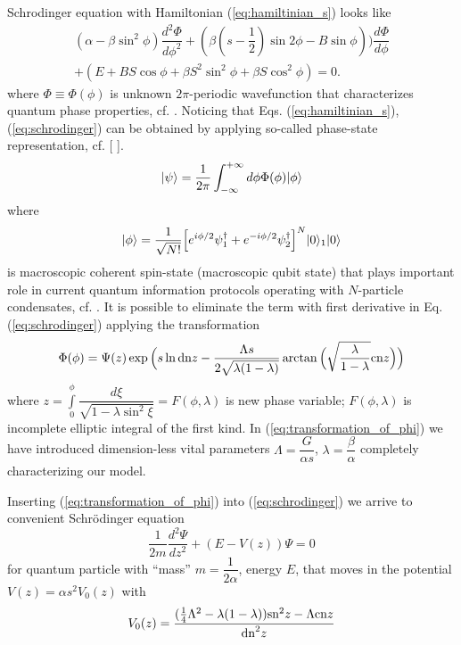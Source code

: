 \documentclass[aps, pre, preprint, groupedaddress, superscriptaddress, showkeys, showpacs] {revtex4-1}
\DeclarePairedDelimiter\ket{\lvert}{\rangle}
\begin{document}
Schrodinger equation with Hamiltonian (\ref{eq:hamiltinian_s}) looks like  
%
\begin{equation}
\begin{array}{l}
(\alpha - \beta \sin^2 \phi) \dfrac{d^2 \Phi}{d \phi^2} + (\beta(s - \dfrac{1}{2})\sin{2\phi}-B\sin{\phi})) \dfrac{d \Phi}{d \phi} \\
+ (E + BS \cos \phi + \beta S^2 \sin^2 \phi + \beta S \cos^2 \phi) = 0.
\end{array}
\label{eq:schrodinger}
\end{equation}
%
where $\Phi \equiv \Phi(\phi)$ is unknown $2\pi$-periodic wavefunction that characterizes quantum phase properties, cf. \cite{Anglin}.
Noticing that Eqs. (\ref{eq:hamiltinian_s}), (\ref{eq:schrodinger}) can be obtained by applying so-called phase-state representation, {\red cf. [  ]}.
%
\begin{equation}
\ket{\psi} = \dfrac{1}{2 \pi} \int_{-\infty}^{+\infty} d \phi \Phi(\phi) \ket{\phi}
\end{equation}
%
where
%
\begin{equation}
\ket{\phi} = \dfrac{1}{\sqrt{N!}} \Big[ e^{i\phi/2} \psi_1^\dagger + e^{-i \phi/2} \psi_2^\dag \Big]^N \ket{0}_1\ket{0}
\end{equation}
%
is macroscopic coherent spin-state (macroscopic qubit state) that plays important role in current quantum information protocols operating with $N$-particle condensates, cf. \cite{Byrnes_2012}.
It is possible to eliminate the term with first derivative in Eq. (\ref{eq:schrodinger}) applying the transformation
%
\begin{equation}
\Phi(\phi) = \Psi(z) \exp \Big( s \ln \textrm{dn}{z} - \dfrac{\Lambda s}{2 \sqrt{\lambda (1 - \lambda)}} \arctan \Big( \sqrt{\dfrac{\lambda}{1 - \lambda}} \textrm{cn}{z} \Big) \Big)
\label{eq:transformation_of_phi}
\end{equation}
%
where $z = \int \limits_0^\phi \dfrac{d \xi}{\sqrt{1 - \lambda \sin^2 \xi}} = F(\phi, \lambda)$ is new phase variable; $F(\phi, \lambda)$ is incomplete elliptic integral of the first kind.
In (\ref{eq:transformation_of_phi}) we have introduced dimension-less vital parameters $\Lambda = \dfrac{G}{\alpha s}$, $\lambda = \dfrac{\beta}{\alpha}$ completely characterizing our model.

Inserting (\ref{eq:transformation_of_phi}) into (\ref{eq:schrodinger}) we arrive to convenient Schr\"odinger equation
%
\begin{equation}
\frac{1}{2 m} \frac{d^2\Psi}{dz^2} + (E - V(z))\Psi = 0
\label{eq:schrodinger_usual}
\end{equation}
%
for quantum particle with ``mass'' $m = \dfrac{1}{2 \alpha}$, energy $E$, that moves in the potential $V(z) = \alpha s^2 V_0(z)$ with
%
\begin{equation}
V_0(z) = \frac{ (\frac{1}{4} \Lambda^2 - \lambda (1 - \lambda)) \textrm{sn}^2{z} - \Lambda \textrm{cn}{z}}{\textrm{dn}^2{z}}
\label{eq:potential}
\end{equation}
%
\end{document}
